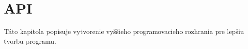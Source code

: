 \chapter{API}
\label{kap:API}
Táto kapitola popisuje vytvorenie vyššieho programovacieho rozhrania pre
lepšiu tvorbu programu.
